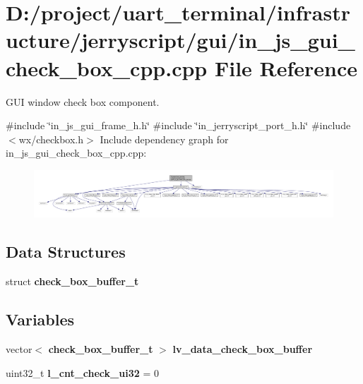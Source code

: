 \section{D\+:/project/uart\+\_\+terminal/infrastructure/jerryscript/gui/in\+\_\+js\+\_\+gui\+\_\+check\+\_\+box\+\_\+cpp.cpp File Reference}
\label{in__js__gui__check__box__cpp_8cpp}


G\+UI window check box component.  


{\ttfamily \#include \char`\"{}in\+\_\+js\+\_\+gui\+\_\+frame\+\_\+h.\+h\char`\"{}}\newline
{\ttfamily \#include \char`\"{}in\+\_\+jerryscript\+\_\+port\+\_\+h.\+h\char`\"{}}\newline
{\ttfamily \#include $<$wx/checkbox.\+h$>$}\newline
Include dependency graph for in\+\_\+js\+\_\+gui\+\_\+check\+\_\+box\+\_\+cpp.\+cpp\+:\nopagebreak
\begin{figure}[H]
\begin{center}
\leavevmode
\includegraphics[width=350pt]{in__js__gui__check__box__cpp_8cpp__incl}
\end{center}
\end{figure}
\subsection*{Data Structures}
\begin{DoxyCompactItemize}
\item 
struct \textbf{ check\+\_\+box\+\_\+buffer\+\_\+t}
\end{DoxyCompactItemize}
\subsection*{Variables}
\begin{DoxyCompactItemize}
\item 
vector$<$ \textbf{ check\+\_\+box\+\_\+buffer\+\_\+t} $>$ \textbf{ lv\+\_\+data\+\_\+check\+\_\+box\+\_\+buffer}
\item 
uint32\+\_\+t {\bfseries l\+\_\+cnt\+\_\+check\+\_\+ui32} = 0
\end{DoxyCompactItemize}


